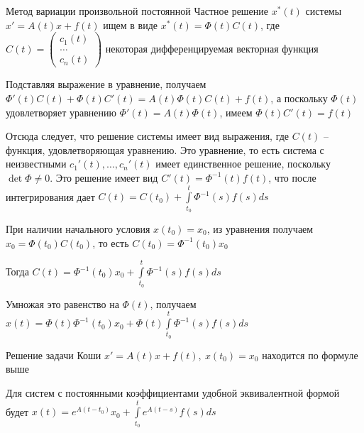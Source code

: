 \documentclass[12pt]{article}
\begin{document}
\begin{nota}{Метод вариации произвольной постоянной}
    Частное решение $x^*(t)$ системы $x' = A(t)x + f(t)$ ищем в виде $x^*(t) = \Phi(t)C(t)$, где $C(t) = \begin{pmatrix}
        c_1(t) \\
        \ldots \\
        c_n(t)
    \end{pmatrix}$ некоторая дифференцируемая векторная функция 

    Подставляя выражение в уравнение, получаем $\Phi'(t)C(t) + \Phi(t)C'(t) = A(t)\Phi(t)C(t) + f(t)$, а поскольку $\Phi(t)$ удовлетворяет уравнению $\Phi'(t) = A(t)\Phi(t)$, имеем $\Phi(t)C'(t) = f(t)$

    Отсюда следует, что решение системы имеет вид выражения, где $C(t)$ -- функция, удовлетворяющая уравнению. Это уравнение, то есть система с неизвестными $c_1'(t), \ldots, c_n'(t)$ имеет единственное решение, поскольку $\det \Phi \neq 0$. Это решение имеет вид $C'(t) = \Phi^{-1}(t)f(t)$, что после интегрирования дает $C(t) = C(t_0) + \int\limits_{t_0}^t \Phi^{-1}(s)f(s)ds$

    При наличии начального условия $x(t_0) = x_0$, из уравнения получаем $x_0 = \Phi(t_0)C(t_0)$, то есть $C(t_0) = \Phi^{-1}(t_0)x_0$

    Тогда $C(t) = \Phi^{-1}(t_0)x_0 + \int\limits_{t_0}^t \Phi^{-1}(s)f(s)ds$

    Умножая это равенство на $\Phi(t)$, получаем $x(t) = \Phi(t)\Phi^{-1}(t_0)x_0 + \Phi(t)\int\limits_{t_0}^t \Phi^{-1}(s)f(s)ds$
\end{nota}

\begin{theo}{}
    Решение задачи Коши $x' = A(t)x + f(t),\ x(t_0) = x_0$ находится по формуле выше 

    Для систем с постоянными коэффициентами удобной эквивалентной формой будет $x(t) = e^{A(t - t_0)}x_0 + \int\limits_{t_0}^t e^{A(t - s)}f(s)ds$
\end{theo}
\end{document}
